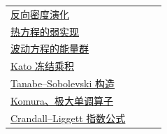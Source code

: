 \begin{longtable}{p{0.80\linewidth}r}
\hyperref[prop:supp-markov-density]{反向密度演化} & \pageref{prop:supp-markov-density}\\
\hyperref[thm:y14-elliptic-form]{热方程的弱实现} & \pageref{thm:y14-elliptic-form}\\
\hyperref[thm:y14-wave-group]{波动方程的能量群} & \pageref{thm:y14-wave-group}\\
\hyperref[thm:y14-kato]{Kato 冻结乘积} & \pageref{thm:y14-kato}\\
\hyperref[thm:y14-tanabe]{Tanabe--Sobolevski 构造} & \pageref{thm:y14-tanabe}\\
\hyperref[thm:y14-komura]{Komura、极大单调算子} & \pageref{thm:y14-komura}\\
\hyperref[thm:y14-crandall-liggett]{Crandall--Liggett 指数公式} & \pageref{thm:y14-crandall-liggett}\\
\bottomrule
\end{longtable}
